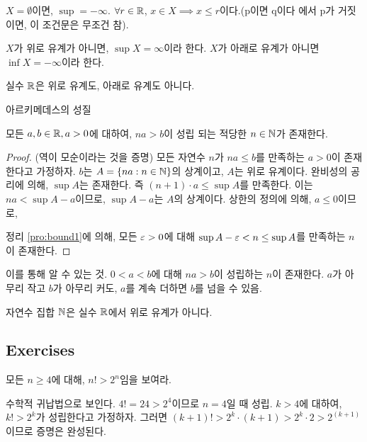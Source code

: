 $X = \emptyset$이면, $\sup = -\infty$.
$\forall r \in \mathbb{R}$, $x \in X \implies x \leq r$이다.(p이면 q이다 에서 p가
거짓이면, 이 조건문은 무조건 참).

\begin{definition}
  $X$가 위로 유계가 아니면, $\sup X = \infty$이라 한다.
  $X$가 아래로 유계가 아니면 $\inf X = -\infty$이라 한다.
  \label{def:not_bound}
\end{definition}

실수 $\mathbb{R}$은 위로 유계도, 아래로 유계도 아니다.

아르키메데스의 성질
\begin{theorem}
  모든 $a, b \in \mathbb{R}, a > 0$에 대하여, $na > b$이 성립 되는 적당한 $n \in \mathbb{N}$가 존재한다.
  \label{thm:arc}
\end{theorem}

\begin{proof}
  (역이 모순이라는 것을 증명)
  모든 자연수 $n$가 $na \le b$를 만족하는 $a > 0$이 존재한다고 가정하자.
  $b$는 $A = \{na : n \in \mathbb{N}\}$의 상계이고, $A$는 위로 유계이다.
  완비성의 공리에 의해, $\sup A$는 존재한다.
  즉 $(n + 1) \cdot a \le \sup A$를 만족한다. 이는
  $na < \sup A - a$이므로,  $\sup A - a$는 $A$의 상계이다.
  상한의 정의에 의해, $a \le 0$이므로,

  정리 \ref{pro:bound1}에 의해, 모든 $\varepsilon > 0$에 대해
  $\sup A - \varepsilon < n \le \sup A$를 만족하는 $n$이 존재한다.
\end{proof}

이를 통해 알 수 있는 것. $0 < a < b$에 대해 $na > b$이 성립하는 $n$이 존재한다.
$a$가 아무리 작고 $b$가 아무리 커도, $a$를 계속 더하면 $b$를 넘을 수 있음.

자연수 집합 $\mathbb{N}$은 실수 $\mathbb{R}$에서 위로 유계가 아니다.


\subsection*{Exercises}

\begin{exercise}
  모든 $n \ge 4$에 대해, $n! > 2^n$임을 보여라.
\end{exercise}

\begin{solution}
  수학적 귀납법으로 보인다.
  $4! = 24 > 2^4$이므로 $n = 4$일 때 성립.
  $k > 4$에 대하여, $k! > 2^k$가 성립한다고 가정하자. 그러면
  $(k + 1)! > 2^k \cdot (k + 1) > 2^k \cdot 2 > 2^(k + 1)$이므로 증명은 완성된다.
\end{solution}

